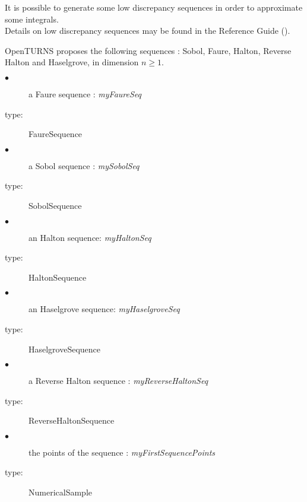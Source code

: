 \renewcommand{\filename}{docUC_LowDiscrepancySequences.tex}
\renewcommand{\filetitle}{UC : Generation of low discrepancy sequences}

\HeaderIILevel

\label{lowDiscrepancySequence}



It is possible to generate some low discrepancy sequences in order to approximate some integrals.\\

Details on low discrepancy sequences  may be found in the Reference Guide ().



OpenTURNS proposes the following sequences : Sobol, Faure, Halton, Reverse Halton and Haselgrove, in dimension $n \geq 1$.


\requirements{
  \begin{description}
  \item[$\bullet$] -
  \end{description}
}
             {
               \begin{description}
               \item[$\bullet$] a Faure sequence : {\itshape myFaureSeq}
               \item[type:] FaureSequence
               \item[$\bullet$] a Sobol sequence : {\itshape mySobolSeq}
               \item[type:] SobolSequence
               \item[$\bullet$] an Halton sequence: {\itshape myHaltonSeq}
               \item[type:] HaltonSequence
               \item[$\bullet$] an Haselgrove sequence: {\itshape myHaselgroveSeq}
               \item[type:] HaselgroveSequence
               \item[$\bullet$] a Reverse Halton sequence : {\itshape myReverseHaltonSeq}
               \item[type:] ReverseHaltonSequence
               \item[$\bullet$] the points of the sequence : {\itshape myFirstSequencePoints}
               \item[type:] NumericalSample
               \end{description}
             }


